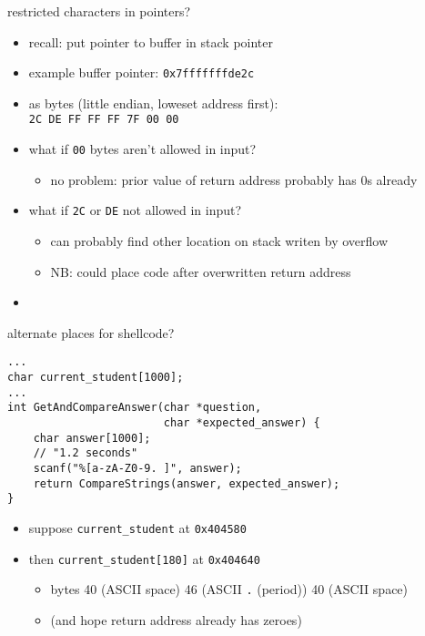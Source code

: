 \begin{frame}{restricted characters in pointers?}
    \begin{itemize}
    \item recall: put pointer to buffer in stack pointer
    \item example buffer pointer: \texttt{0x7fffffffde2c}
    \item as bytes (little endian, loweset address first): \\
         \texttt{2C DE FF FF FF 7F 00 00}
    \vspace{.5cm}
    \item what if \texttt{00} bytes aren't allowed in input?
        \begin{itemize}
        \item no problem: prior value of return address probably has 0s already
        \end{itemize}
    \item what if \texttt{2C} or \texttt{DE} not allowed in input?
        \begin{itemize}
        \item can probably find other location on stack writen by overflow
        \item NB: could place code after overwritten return address
        \end{itemize}
    \item {}
    \end{itemize}
\end{frame}

\begin{frame}[fragile,label=altShellcode]{alternate places for shellcode?}
\begin{lstlisting}[style=smaller]
...
char current_student[1000];
...
int GetAndCompareAnswer(char *question,
                        char *expected_answer) {
    char answer[1000];
    // "1.2 seconds"
    scanf("%[a-zA-Z0-9. ]", answer);
    return CompareStrings(answer, expected_answer);
}
\end{lstlisting}
\begin{itemize}
\item suppose \texttt{current\_student} at \texttt{0x404580}
\item then \texttt{current\_student[180]} at \texttt{0x404640}
    \begin{itemize}
    \item bytes 40 (ASCII space) 46 (ASCII \texttt{.} (period)) 40 (ASCII space)
    \item (and hope return address already has zeroes)
    \end{itemize}
\end{itemize}
\end{frame}
